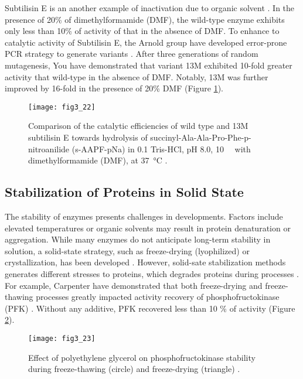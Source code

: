 \begin{refsection}
Subtilisin E is an another example of inactivation due to organic solvent
\cite{You1996}. In the presence of 20\% of dimethylformamide (DMF), the
wild-type enzyme exhibits only less than 10\% of activity of that in the
absence of DMF. To enhance to catalytic activity of Subtilisin E, the Arnold
group have developed error-prone PCR strategy to generate variants
\cite{You1996}. After three generations of random mutagenesis, You  have demonstrated that variant 13M exhibited 10-fold greater activity that
wild-type in the absence of DMF. Notably, 13M was further improved by 16-fold
in the presence of 20\% DMF \cite{You1996} (Figure \ref{fig:arnold}). 
\begin{figure}[htbp] \centering \texttt{[image: fig3\_22]}
    \caption[Comparison of the catalytic efficiencies of wild type and 13M
    subtilisin E towards hydrolysis of succinyl-Ala-Ala-Pro-Phe-p-nitroanilide
(s-AAPF-pNa) in \SI{0.1}{\Molar} Tris-HCl, pH 8.0,
\SI{10}{\milli\Molar}{} with dimethylformamide (DMF), at
\SI{37}{\celsius}.]{Comparison of the catalytic efficiencies of wild type and
    13M subtilisin E towards hydrolysis of
    succinyl-Ala-Ala-Pro-Phe-p-nitroanilide (s-AAPF-pNa) in \SI{0.1}{\Molar}
    Tris-HCl, pH 8.0, \SI{10}{\milli\Molar}{} with dimethylformamide
    (DMF), at \SI{37}{\celsius}  \cite{You1996}.} \label{fig:arnold}
\end{figure}

\subsection{Stabilization of Proteins in Solid State}

The stability of enzymes presents challenges in developments. Factors include
elevated temperatures \cite{Rupley1991} or organic solvents
\cite{Stepankova2013} may result in protein denaturation or aggregation. While
many enzymes do not anticipate long-term stability in solution, a solid-state
strategy, such as freeze-drying (lyophilized) \cite{Carpenter1993} or
crystallization, has been developed \cite{Taylor2010}. However, solid-sate
stabilization methods generates different stresses to proteins, which degrades
proteins during processes \cite{Taylor2010}. For example, Carpenter  have demonstrated that both freeze-drying and freeze-thawing processes
greatly impacted activity recovery of phosphofructokinase (PFK)
\cite{Carpenter1993}. Without any additive, PFK recovered less than 10 \% of
activity \cite{Carpenter1993} (Figure \ref{fig:pfk}).  
\begin{figure}[htbp] \centering \texttt{[image: fig3\_23]}
    \caption[Effect of polyethylene glycerol on phosphofructokinase stability
    during freeze-thawing (circle) and freeze-drying (triangle).] {Effect of
        polyethylene glycerol on phosphofructokinase stability during
        freeze-thawing (circle) and freeze-drying (triangle)
        \cite{Carpenter1993}.} 
    \label{fig:pfk}
\end{figure}


\end{refsection}
